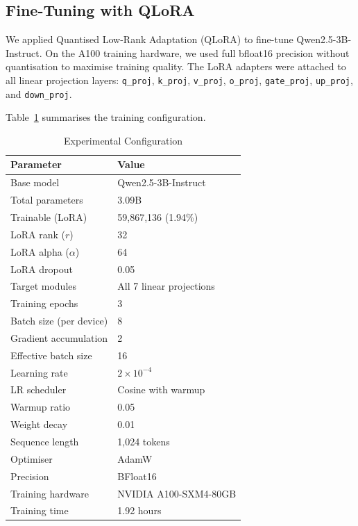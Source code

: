 \documentclass[conference]{IEEEtran}
\begin{document}
\subsection{Fine-Tuning with QLoRA}

We applied Quantised Low-Rank Adaptation (QLoRA) \cite{dettmers2023qlora}
to fine-tune Qwen2.5-3B-Instruct. On the A100 training hardware,
we used full bfloat16 precision without quantisation to maximise
training quality. The LoRA adapters were attached to all linear
projection layers: \texttt{q\_proj}, \texttt{k\_proj},
\texttt{v\_proj}, \texttt{o\_proj}, \texttt{gate\_proj},
\texttt{up\_proj}, and \texttt{down\_proj}.

Table~\ref{tab:config} summarises the training configuration.

\begin{table}[h!]
\centering
\caption{Experimental Configuration}
\label{tab:config}
\begin{tabular}{ll}
\toprule
\textbf{Parameter} & \textbf{Value} \\
\midrule
Base model              & Qwen2.5-3B-Instruct \\
Total parameters        & 3.09B \\
Trainable (LoRA)        & 59{,}867{,}136 (1.94\%) \\
LoRA rank ($r$)         & 32 \\
LoRA alpha ($\alpha$)   & 64 \\
LoRA dropout            & 0.05 \\
Target modules          & All 7 linear projections \\
Training epochs         & 3 \\
Batch size (per device) & 8 \\
Gradient accumulation   & 2 \\
Effective batch size    & 16 \\
Learning rate           & $2 \times 10^{-4}$ \\
LR scheduler            & Cosine with warmup \\
Warmup ratio            & 0.05 \\
Weight decay            & 0.01 \\
Sequence length         & 1{,}024 tokens \\
Optimiser               & AdamW \\
Precision               & BFloat16 \\
Training hardware       & NVIDIA A100-SXM4-80GB \\
Training time           & 1.92 hours \\
\bottomrule
\end{tabular}
\end{table}
\end{document}
